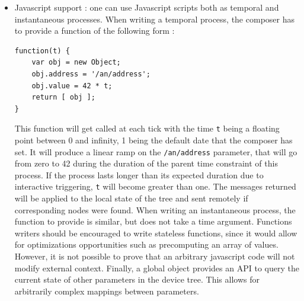 \documentclass{article}
\begin{document}
\begin{itemize}
\item Javascript support : one can use Javascript scripts both as temporal and instantaneous processes.
When writing a temporal process, the composer has to provide a function of the following form : 
\begin{lstlisting}
function(t) {      
    var obj = new Object; 
    obj.address = '/an/address'; 
    obj.value = 42 * t; 
    return [ obj ];
}
\end{lstlisting}
This function will get called at each tick with the time \lstinline{t} being a floating point between 0 and infinity, 1 being the default date that the composer has set. 
It will produce a linear ramp on the \lstinline|/an/address| parameter, that will go from zero to 42 during the duration of the parent time constraint of this process.
If the process lasts longer than its expected duration due to interactive triggering, \lstinline|t| will become greater than one.
The messages returned will be applied to the local state of the tree and sent remotely if corresponding nodes were found.
When writing an instantaneous process, the function to provide is similar, but does not take a time argument.
Functions writers should be encouraged to write stateless functions, since it would allow for optimizations opportunities such as precomputing an array of values. 
However, it is not possible to prove that an arbitrary javascript code will not modify external context.
Finally, a global object provides an API to query the current state of other parameters in the device tree.
This allows for arbitrarily complex mappings between parameters.


\end{itemize}
\end{document}
